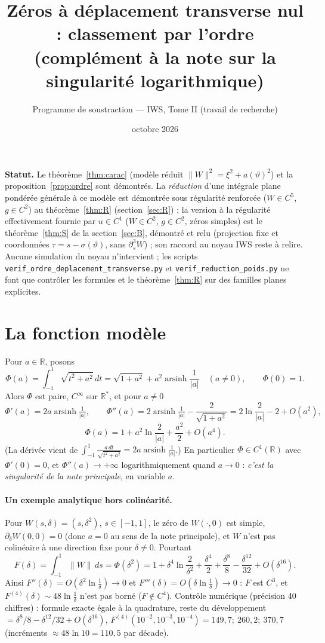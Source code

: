 \documentclass[11pt,a4paper]{article}
\title{Zéros à déplacement transverse nul : classement par l'ordre\\[2pt]
\large (complément à la note sur la singularité logarithmique)}
\author{Programme de soustraction --- IWS, Tome II (travail de recherche)}
\date{octobre 2026}
\theoremstyle{remark}
\newcommand{\R}{\mathbb R}
\newcommand{\vth}{\vartheta}
\newcommand{\asinh}{\operatorname{arsinh}}
\begin{document}
\maketitle

\noindent\textbf{Statut.} Le théorème~\ref{thm:carac} (modèle réduit $\lVert W\rVert^2=\xi^2+a(\vth)^2$) et la proposition~\ref{prop:ordre} sont démontrés. La \emph{réduction} d'une intégrale plane pondérée générale à ce modèle est démontrée sous régularité renforcée ($W\in C^5$, $g\in C^2$) au théorème~\ref{thm:R} (section~\ref{sec:R}) ; la version à la régularité effectivement fournie par $u\in C^1$ ($W\in C^2$, $g\in C^2$, zéros simples) est le théorème~\ref{thm:S} de la section~\ref{sec:B}, démontré et relu (projection fixe et coordonnées $\tau=s-\sigma(\vth)$, sans $\partial_s^3W$) ; son raccord au noyau IWS reste à relire. Aucune simulation du noyau n'intervient ; les scripts \texttt{verif\_ordre\_deplacement\_transverse.py} et \texttt{verif\_reduction\_poids.py} ne font que contrôler les formules et le théorème~\ref{thm:R} sur des familles planes explicites.

\section{La fonction modèle}
Pour $a\in\R$, posons
\[
\Phi(a)=\int_{-1}^{1}\sqrt{t^2+a^2}\,dt=\sqrt{1+a^2}+a^2\asinh\frac1{\lvert a\rvert}\quad(a\ne0),\qquad\Phi(0)=1 .
\]
Alors $\Phi$ est paire, $C^\infty$ sur $\R^*$, et pour $a\neq0$
\[
\Phi'(a)=2a\asinh\tfrac1{\lvert a\rvert},\qquad
\Phi''(a)=2\asinh\tfrac1{\lvert a\rvert}-\frac2{\sqrt{1+a^2}}=2\ln\frac2{\lvert a\rvert}-2+O(a^2),
\]
\[
\Phi(a)=1+a^2\ln\frac2{\lvert a\rvert}+\frac{a^2}2+O(a^4).
\]
(La dérivée vient de $\int_{-1}^1\frac{a\,dt}{\sqrt{t^2+a^2}}=2a\asinh\frac1{\lvert a\rvert}$.) En particulier $\Phi\in C^1(\R)$ avec $\Phi'(0)=0$, et $\Phi''(a)\to+\infty$ logarithmiquement quand $a\to0$ : \emph{c'est la singularité de la note principale}, en variable $a$.

\paragraph{Un exemple analytique hors colinéarité.} Pour $W(s,\delta)=(s,\delta^2)$, $s\in[-1,1]$, le zéro de $W(\cdot,0)$ est simple, $\partial_\delta W(0,0)=0$ (donc $a=0$ au sens de la note principale), et $W$ n'est pas colinéaire à une direction fixe pour $\delta\ne0$. Pourtant
\[
F(\delta)=\int_{-1}^1\lVert W\rVert\,ds=\Phi(\delta^2)=1+\delta^4\ln\frac2{\delta^2}+\frac{\delta^4}2+\frac{\delta^8}8-\frac{\delta^{12}}{32}+O(\delta^{16}).
\]
Ainsi $F''(\delta)=O(\delta^2\ln\frac1\delta)\to0$ et $F'''(\delta)=O(\delta\ln\frac1\delta)\to0$ : $F$ est $C^3$, et $F^{(4)}(\delta)\sim48\ln\frac1\delta$ n'est pas borné ($F\notin C^4$). Contrôle numérique (précision 40 chiffres) : formule exacte égale à la quadrature, reste du développement $=\delta^8/8-\delta^{12}/32+O(\delta^{16})$, $F^{(4)}(10^{-2},10^{-3},10^{-4})=149{,}7;\ 260{,}2;\ 370{,}7$ (incréments $\approx48\ln10=110{,}5$ par décade).
\end{document}

